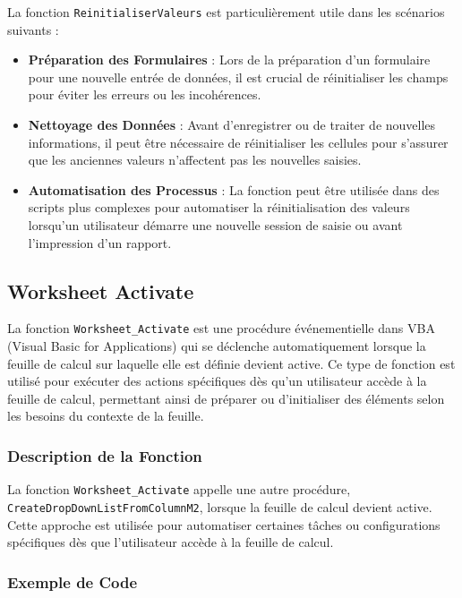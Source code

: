 \documentclass[a4paper, oneside, 12pt, final]{extreport}
\begin{document}
\begin{itemize}
La fonction \texttt{ReinitialiserValeurs} est particulièrement utile dans les scénarios suivants :

\begin{itemize}
    \item \textbf{Préparation des Formulaires} : Lors de la préparation d'un formulaire pour une nouvelle entrée de données, il est crucial de réinitialiser les champs pour éviter les erreurs ou les incohérences.
    \item \textbf{Nettoyage des Données} : Avant d'enregistrer ou de traiter de nouvelles informations, il peut être nécessaire de réinitialiser les cellules pour s'assurer que les anciennes valeurs n'affectent pas les nouvelles saisies.
    \item \textbf{Automatisation des Processus} : La fonction peut être utilisée dans des scripts plus complexes pour automatiser la réinitialisation des valeurs lorsqu'un utilisateur démarre une nouvelle session de saisie ou avant l'impression d'un rapport.
\end{itemize}
\end{itemize}
\subsection{Worksheet Activate}

La fonction \texttt{Worksheet\_Activate} est une procédure événementielle dans VBA (Visual Basic for Applications) qui se déclenche automatiquement lorsque la feuille de calcul sur laquelle elle est définie devient active. Ce type de fonction est utilisé pour exécuter des actions spécifiques dès qu'un utilisateur accède à la feuille de calcul, permettant ainsi de préparer ou d'initialiser des éléments selon les besoins du contexte de la feuille.

\subsubsection{Description de la Fonction}

La fonction \texttt{Worksheet\_Activate} appelle une autre procédure, \texttt{CreateDropDownListFromColumnM2}, lorsque la feuille de calcul devient active. Cette approche est utilisée pour automatiser certaines tâches ou configurations spécifiques dès que l'utilisateur accède à la feuille de calcul.

\subsubsection{Exemple de Code}
\end{document}

